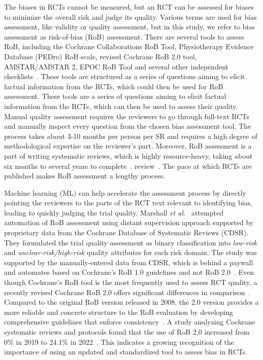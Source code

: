 \documentclass[sn-mathphys,Numbered]{sn-jnl}%
\theoremstyle{thmstyleone}%
\theoremstyle{thmstyletwo}%
\theoremstyle{thmstylethree}%
\begin{document}
The biases in RCTs cannot be measured, but an RCT can be assessed for biases to minimize the overall risk and judge its quality.
Various terms are used for bias assessment, like validity or quality assessment, but in this study, we refer to bias assessment as risk-of-bias (RoB) assessment.
There are several tools to assess RoB, including the Cochrane Collaborations RoB Tool, Physiotherapy Evidence Database (PEDro) RoB scale, revised Cochrane RoB 2.0 tool, AMSTAR/AMSTAR 2, EPOC RoB Tool and several other independent checklists~\cite{higgins2011cochrane,elkins2013growth,sterne2019rob,shea2017amstar,farrah2019risk}.
These tools are structured as a series of questions aiming to elicit factual information from the RCTs, which could then be used for RoB assessment.
These tools are a series of questions aiming to elicit factual information from the RCTs, which can then be used to assess their quality.
Manual quality assessment requires the reviewers to go through full-text RCTs and manually inspect every question from the chosen bias assessment tool.
The process takes about 3-10 months per person per SR and requires a high degree of methodological expertise on the reviewer's part.
Moreover, RoB assessment is a part of writing systematic reviews, which is highly resource-heavy, taking about six months to several years to complete~\cite{tsertsvadze2015conduct, khangura2012evidence}.
review~\cite{higgins2019cochrane}.
The pace at which RCTs are published makes RoB assessment a lengthy process.

Machine learning (ML) can help accelerate the assessment process by directly pointing the reviewers to the parts of the RCT text relevant to identifying bias, leading to quickly judging the trial quality.
Marshall \textit{et al.}~\cite{marshall2015automating} attempted automation of RoB assessment using distant supervision approach supported by proprietary data from the Cochrane Database of Systematic Reviews (CDSR). 
They formulated the trial quality assessment as binary classification into \textit{low-risk} and \textit{unclear-risk/high-risk} quality attributes for each risk domain.
The study was supported by the manually-entered data from CDSR, which is behind a paywall and automates based on Cochrane's RoB 1.0 guidelines and not RoB 2.0~\cite{higgins2011cochrane}.
Even though Cochrane's RoB tool is the most frequently used to assess RCT quality, a recently revised Cochrane RoB 2.0 offers significant differences in comparison~\cite{ma2020methodological}.
Compared to the original RoB version released in 2008, the 2.0 version provides a more reliable and concrete structure to the RoB evaluation by developing comprehensive guidelines that enforce consistency~\cite{higgins2011cochrane,sterne2019rob}.
A study analyzing Cochrane systematic reviews and protocols found that the use of RoB 2.0 increased from 0\% in 2019 to 24.1\% in 2022~\cite{martimbianco2023most}.
This indicates a growing recognition of the importance of using an updated and standardized tool to assess bias in RCTs.
\end{document}
